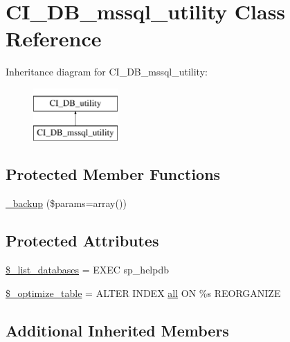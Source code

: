 \hypertarget{class_c_i___d_b__mssql__utility}{}\section{C\+I\+\_\+\+D\+B\+\_\+mssql\+\_\+utility Class Reference}
\label{class_c_i___d_b__mssql__utility}
Inheritance diagram for C\+I\+\_\+\+D\+B\+\_\+mssql\+\_\+utility\+:\begin{figure}[H]
\begin{center}
\leavevmode
\includegraphics[height=2.000000cm]{class_c_i___d_b__mssql__utility}
\end{center}
\end{figure}
\subsection*{Protected Member Functions}
\begin{DoxyCompactItemize}
\item 
\hyperlink{class_c_i___d_b__mssql__utility_a30f3053d2c82e7562349924363507afa}{\+\_\+backup} (\$params=array())
\end{DoxyCompactItemize}
\subsection*{Protected Attributes}
\begin{DoxyCompactItemize}
\item 
\hyperlink{class_c_i___d_b__mssql__utility_afe3a5b80562d93d6bc7e2b53c95b7e5a}{\$\+\_\+list\+\_\+databases} = \textquotesingle{}E\+X\+E\+C sp\+\_\+helpdb\textquotesingle{}
\item 
\hyperlink{class_c_i___d_b__mssql__utility_a083199e5c22c78912dae0a47bb2d7fad}{\$\+\_\+optimize\+\_\+table} = \textquotesingle{}A\+L\+T\+E\+R I\+N\+D\+E\+X \hyperlink{change_team_8php_a5f3fcf87333f5770d16608f67ad88d19}{all} O\+N \%s R\+E\+O\+R\+G\+A\+N\+I\+Z\+E\textquotesingle{}
\end{DoxyCompactItemize}
\subsection*{Additional Inherited Members}


